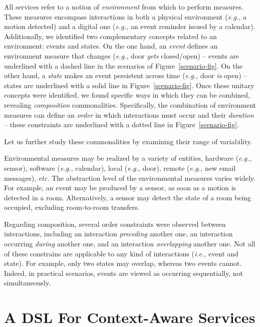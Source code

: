  All services refer to a notion of {\em environment} from which to perform measures. These measures encompass interactions in both a physical environment ({\em e.g.,} a motion detected) and  a digital one ({\em e.g.,} an event reminder issued by a calendar). Additionally, we identified two complementary concepts related to an environment: events and states. On the one hand, an {\em event} defines an environment measure that changes ({\em e.g.,} door {\em gets} closed/open) -- events are underlined with a dashed line in the scenarios of Figure~\ref{scenario-fig}. On the other hand, a {\em state} makes an event persistent across time ({\em e.g.,} door {\em is} open) -- states are underlined with a solid line in Figure~\ref{scenario-fig}. Once these unitary concepts were identified, we found specific ways in which they can be combined, revealing {\em composition} commonalities. Specifically, the combination of environment measures can define an {\em order} in which interactions must occur and their {\em duration} -- these constraints are underlined with a dotted line in Figure~\ref{scenario-fig}.

Let us further study these commonalities by examining their range of variability.

 Environmental measures may be realized by a variety of entities, hardware ({\em e.g.,} sensor), software ({\em e.g.,} calendar), local ({\em e.g.,} door), remote ({\em e.g.,} new email messages), {\em etc.} The abstraction level of the environmental measures varies widely. For example, an event may be produced by a sensor, as soon as a motion is detected in a room. Alternatively, a sensor may detect the state of a room being occupied, excluding room-to-room transfers.

Regarding composition, several order constraints were observed between interactions, including an interaction {\em preceding} another one, an interaction occurring {\em during} another one, and an interaction {\em overlapping} another one. Not all of these constrains are applicable to any kind of interactions ({\em i.e.,} event and state). For example, only two states may overlap, whereas two events cannot. Indeed, in practical scenarios, events are viewed as occurring sequentially, not simultaneously.



\section{A DSL For Context-Aware Services}\label{sec:dsl}

